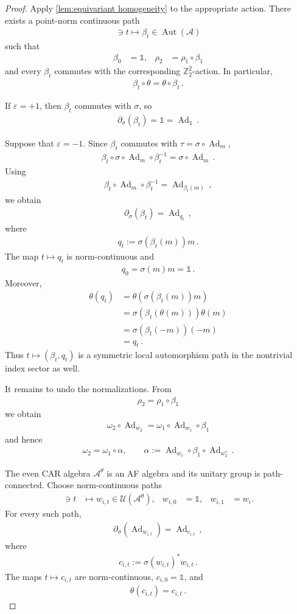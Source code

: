 \documentclass[a4paper,10pt]{article}
\numberwithin{equation}{section}
\theoremstyle{plain}
\theoremstyle{plain}
\theoremstyle{plain}
\theoremstyle{plain}
\theoremstyle{plain}
\theoremstyle{remark}
\theoremstyle{definition}
\newcommand{\ZZ}{\mathbb{Z}}
\newcommand{\calA}{\mathcal{A}}
\newcommand{\calU}{\mathcal{U}}
\newcommand{\Ad}[1]{\operatorname{Ad}_{#1}}
\newcommand{\Id}{\mathds{1}}
\newcommand{\eq}[1]{\begin{align*}#1\end{align*}}
\newcommand{\eql}[1]{\begin{align}#1\end{align}}
\begin{document}
\begin{proof}
Apply \cref{lem:equivariant homogeneity} to the appropriate action.
There exists a point-norm continuous path
\eq{
    [0,1]\ni t
    \longmapsto
    \beta_t\in\operatorname{Aut}(\calA)
}
such that
\eq{
    \beta_0
    &=
    \Id,&
    \rho_2
    &=
    \rho_1\circ\beta_1
}
and every \(\beta_t\) commutes with the corresponding
\(\ZZ_2^2\)-action. In particular,
\eq{
    \beta_t\circ\theta
    =
    \theta\circ\beta_t\,.
}

If \(\varepsilon=+1\), then \(\beta_t\) commutes with \(\sigma\), so
\eq{
    \partial_\sigma(\beta_t)
    =
    \Id
    =
    \Ad{\Id}\,.
}

Suppose that \(\varepsilon=-1\). Since \(\beta_t\) commutes with
\(\tau=\sigma\circ\Ad{m}\),
\eq{
    \beta_t\circ\sigma\circ\Ad{m}\circ\beta_t^{-1}
    =
    \sigma\circ\Ad{m}\,.
}
Using
\eq{
    \beta_t\circ\Ad{m}\circ\beta_t^{-1}
    =
    \Ad{\beta_t(m)}\, ,
}
we obtain
\eq{
    \partial_\sigma(\beta_t)
    =
    \Ad{q_t}\, ,
}
where
\eql{
    q_t
    :=
    \sigma\left(\beta_t(m)\right)m
    \label{eq:beta locality cocycle}\,.
}
The map \(t\mapsto q_t\) is norm-continuous and
\eq{
    q_0
    =
    \sigma(m)m
    =
    \Id\,.
}
Moreover,
\eq{
    \theta(q_t)
    &=
    \theta\left(
        \sigma(\beta_t(m))m
    \right)\\
    &=
    \sigma\left(
        \beta_t(\theta(m))
    \right)\theta(m)\\
    &=
    \sigma\left(
        \beta_t(-m)
    \right)(-m)\\
    &=
    q_t\,.
}
Thus \(t\mapsto(\beta_t,q_t)\) is a symmetric local automorphism path
in the nontrivial index sector as well.

It remains to undo the normalizations. From
\eq{
    \rho_2
    =
    \rho_1\circ\beta_1
}
we obtain
\eq{
    \omega_2\circ\Ad{w_2}
    =
    \omega_1\circ\Ad{w_1}\circ\beta_1
}
and hence
\eql{
    \omega_2
    =
    \omega_1\circ\alpha,
    \qquad
    \alpha
    :=
    \Ad{w_1}\circ\beta_1\circ\Ad{w_2^*}
    \label{eq:final automorphism}\,.
}

The even CAR algebra \(\calA^\theta\) is an AF algebra and its unitary
group is path-connected. Choose norm-continuous paths
\eq{
    [0,1]\ni t
    &\longmapsto
    w_{i,t}\in\calU(\calA^\theta),&
    w_{i,0}
    &=
    \Id,&
    w_{i,1}
    &=
    w_i.
}
For every such path,
\eq{
    \partial_\sigma\left(\Ad{w_{i,t}}\right)
    =
    \Ad{c_{i,t}}\, ,
}
where
\eql{
    c_{i,t}
    :=
    \sigma(w_{i,t})^*w_{i,t}
    \label{eq:inner locality cocycle}\,.
}
The maps \(t\mapsto c_{i,t}\) are norm-continuous,
\(c_{i,0}=\Id\), and
\eq{
    \theta(c_{i,t})
    =
    c_{i,t}\,.
}


\end{proof}
\end{document}

